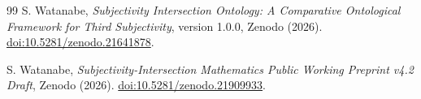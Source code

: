 \documentclass[11pt]{article}
\theoremstyle{definition}
\theoremstyle{remark}
\begin{document}
\begin{thebibliography}{99}
S. Watanabe, \emph{Subjectivity Intersection Ontology: A Comparative Ontological Framework for Third Subjectivity}, version 1.0.0, Zenodo (2026). \href{https://doi.org/10.5281/zenodo.21641878}{doi:10.5281/zenodo.21641878}.

S. Watanabe, \emph{Subjectivity-Intersection Mathematics Public Working Preprint v4.2 Draft}, Zenodo (2026). \href{https://doi.org/10.5281/zenodo.21909933}{doi:10.5281/zenodo.21909933}.

\end{thebibliography}
\end{document}
